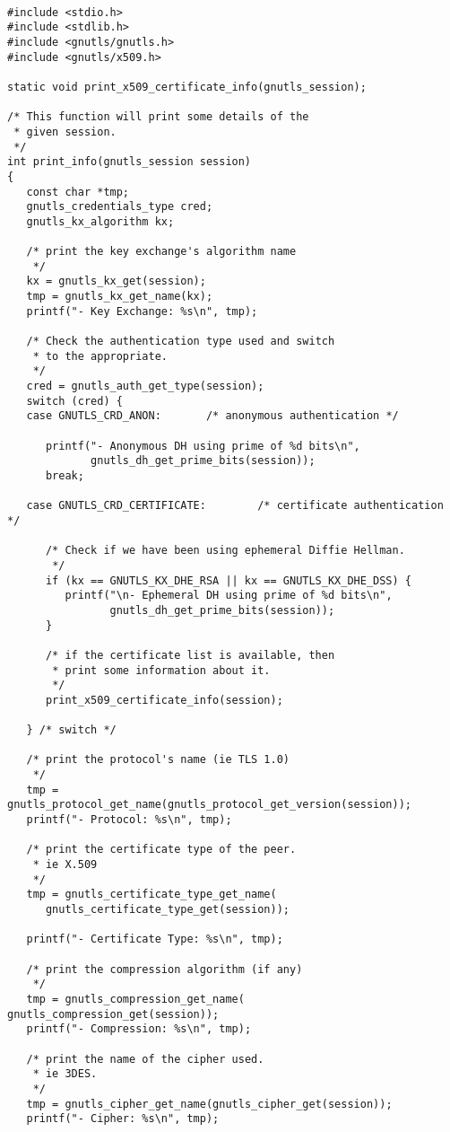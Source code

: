 \begin{verbatim}

#include <stdio.h>
#include <stdlib.h>
#include <gnutls/gnutls.h>
#include <gnutls/x509.h>

static void print_x509_certificate_info(gnutls_session);

/* This function will print some details of the
 * given session.
 */
int print_info(gnutls_session session)
{
   const char *tmp;
   gnutls_credentials_type cred;
   gnutls_kx_algorithm kx;

   /* print the key exchange's algorithm name
    */
   kx = gnutls_kx_get(session);
   tmp = gnutls_kx_get_name(kx);
   printf("- Key Exchange: %s\n", tmp);

   /* Check the authentication type used and switch
    * to the appropriate.
    */
   cred = gnutls_auth_get_type(session);
   switch (cred) {
   case GNUTLS_CRD_ANON:       /* anonymous authentication */

      printf("- Anonymous DH using prime of %d bits\n",
             gnutls_dh_get_prime_bits(session));
      break;

   case GNUTLS_CRD_CERTIFICATE:        /* certificate authentication */
      
      /* Check if we have been using ephemeral Diffie Hellman.
       */
      if (kx == GNUTLS_KX_DHE_RSA || kx == GNUTLS_KX_DHE_DSS) {
         printf("\n- Ephemeral DH using prime of %d bits\n",
                gnutls_dh_get_prime_bits(session));
      }

      /* if the certificate list is available, then
       * print some information about it.
       */
      print_x509_certificate_info(session);

   } /* switch */

   /* print the protocol's name (ie TLS 1.0) 
    */
   tmp = gnutls_protocol_get_name(gnutls_protocol_get_version(session));
   printf("- Protocol: %s\n", tmp);

   /* print the certificate type of the peer.
    * ie X.509
    */
   tmp = gnutls_certificate_type_get_name(
      gnutls_certificate_type_get(session));

   printf("- Certificate Type: %s\n", tmp);

   /* print the compression algorithm (if any)
    */
   tmp = gnutls_compression_get_name( gnutls_compression_get(session));
   printf("- Compression: %s\n", tmp);

   /* print the name of the cipher used.
    * ie 3DES.
    */
   tmp = gnutls_cipher_get_name(gnutls_cipher_get(session));
   printf("- Cipher: %s\n", tmp);


\end{verbatim}
